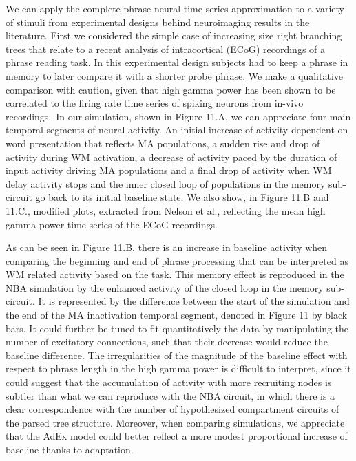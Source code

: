 \documentclass[10pt]{article}
\begin{document}
We can apply the complete phrase neural time series approximation to a
variety of stimuli from experimental designs behind neuroimaging results
in the literature. First we considered the simple case of increasing
size right branching trees that relate to a recent analysis of
intracortical (ECoG) recordings of a phrase reading
task\cite{Nelson_2017}. In this experimental design subjects had to keep
a phrase in memory to later compare it with a shorter probe phrase. We
make a qualitative comparison with caution, given that high gamma power
has been shown to be correlated to the firing rate time series of
spiking neurons from in-vivo recordings\cite{Ray_2011}.~In our
simulation, shown in Figure 11.A, we can appreciate four main temporal
segments of neural activity. An initial increase of activity dependent
on word presentation that reflects MA populations, a sudden rise and
drop of activity during WM activation, a decrease of activity paced by
the duration of input activity driving MA populations and a final drop
of activity when WM delay activity stops and the inner closed loop of
populations in the memory sub-circuit go back to its initial baseline
state. We also show, in Figure 11.B and 11.C., modified plots, extracted
from Nelson et al., reflecting the mean high gamma power time series of
the ECoG recordings.

As can be seen in Figure 11.B, there is an increase in baseline activity
when comparing the beginning and end of phrase processing that can be
interpreted as WM related activity based on the task. This memory effect
is reproduced in the NBA simulation by the enhanced activity of the
closed loop in the memory sub-circuit. It is represented by the
difference between the start of the simulation and the end of the MA
inactivation temporal segment, denoted in Figure 11 by black bars. It
could further be tuned to fit quantitatively the data by manipulating
the number of excitatory connections, such that their decrease would
reduce the baseline difference. The irregularities of the magnitude of
the baseline effect with respect to phrase length in the high gamma
power is difficult to interpret, since it could suggest that the
accumulation of activity with more recruiting nodes is subtler than what
we can reproduce with the NBA circuit, in which there is a clear
correspondence with the number of hypothesized compartment circuits of
the parsed tree structure. Moreover, when comparing simulations, we
appreciate that the AdEx model could better reflect a more modest
proportional increase of baseline thanks to adaptation.~
\end{document}
